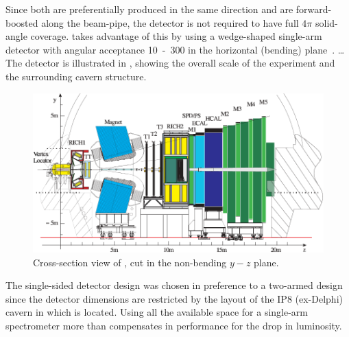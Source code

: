 Since both  are preferentially produced in the same direction 
and are forward-boosted along the beam-pipe, the detector is not required 
to have full $4\pi$ solid-angle coverage. \LHCb takes advantage of this 
by using a wedge-shaped single-arm detector with angular acceptance 
\unit{10-300}{\mrad} in the horizontal (bending) plane~\cite{Amato:1998xt}.
\vspace{1cm}
\dots
\vspace{1cm}
The detector is illustrated in , showing 
the overall scale of the experiment and the surrounding cavern structure.

\begin{figure}
  \includegraphics[width=0.8\textheight]{lhcb-detector-cross-section}
  \caption[Cross-section view of \LHCb, cut in the non-bending $y-z$ plane]%
    {Cross-section view of \LHCb, cut in the non-bending $y-z$ plane.}
  \label{fig:LHCbCrossSection}
\end{figure}

The single-sided detector design was chosen in preference to a two-armed
design since the detector dimensions are restricted by the layout of the 
IP8 (ex-Delphi) cavern in which \LHCb is located. Using all the available 
space for a single-arm spectrometer more than compensates in performance 
for the \about{50\percent} drop in luminosity.


